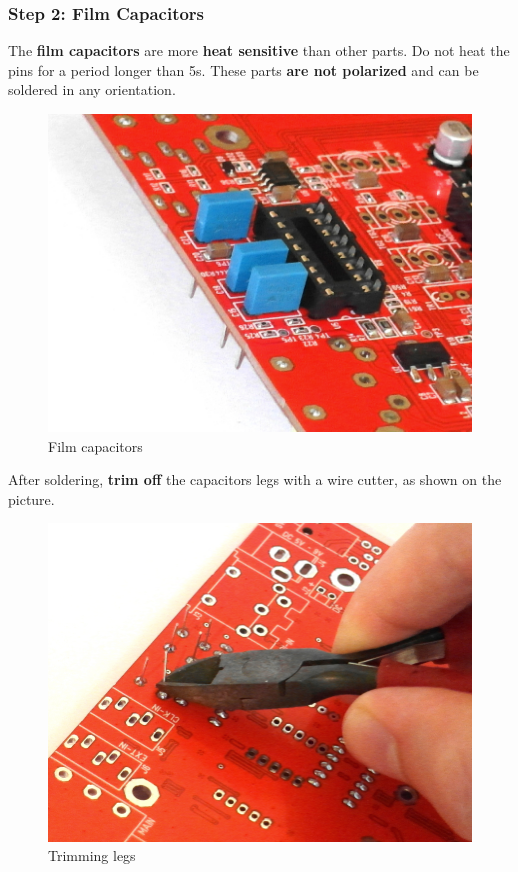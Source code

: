 \documentclass{scrartcl}
\begin{document}
\pagebreak
\subsubsection{Step 2: Film Capacitors}

The \textbf{film capacitors} are more \textbf{heat sensitive} than other parts. Do not heat the pins for a period longer than 5s.
These parts \textbf{are not polarized} and can be soldered in any orientation.

\begin{figure}[!ht]
    \begin{center}
        \includegraphics[scale=0.24]{assets/pcb-caps.jpg}
        \caption{Film capacitors}
    \end{center}
\end{figure}

After soldering, \textbf{trim off} the capacitors legs with a wire cutter, as shown on the picture.

\begin{figure}[!ht]
    \begin{center}
        \includegraphics[scale=0.24]{assets/pcb-legs.jpg}
        \caption{Trimming legs}
    \end{center}
\end{figure}
\end{document}
